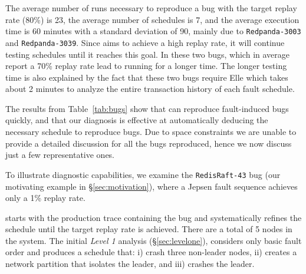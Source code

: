 The average number of runs necessary to reproduce a bug with the target replay rate (80\%) is 23, the average number of schedules is 7, and the average execution time is 60 minutes with a standard deviation of 90, mainly due to \texttt{Redpanda-3003} and \texttt{Redpanda-3039}.
Since \sys aims to achieve a high replay rate, it will continue testing schedules until it reaches this goal.
In these two bugs, which in average report a 70\% replay rate lead to \sys running for a longer time.
The longer testing time is also explained by the fact that these two bugs require Elle which takes about 2 minutes to analyze the entire transaction history of each fault schedule.

The results from Table~\ref{tab:bugs} show that \sys can reproduce fault-induced bugs quickly, and that our diagnosis is effective at automatically deducing the necessary schedule to reproduce bugs.
Due to space constraints we are unable to provide a detailed discussion for all the bugs reproduced, hence we now discuss just a few representative ones.


To illustrate \sys diagnostic capabilities, we examine the \texttt{RedisRaft-43} bug (our motivating example in \S\ref{sec:motivation}), where a Jepsen fault sequence achieves only a 1\% replay rate.

\sys starts with the production trace containing the bug and systematically refines the schedule until the target replay rate is achieved.
There are a total of 5 nodes in the system.
The initial \emph{Level 1} analysis (\S\ref{sec:levelone}), considers only basic fault order and produces a schedule that:
i) crash three non-leader nodes,
ii) creates a network partition that isolates the leader, and
iii) crashes the leader.

